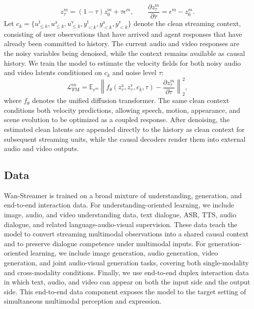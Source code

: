\documentclass{llmxive}
\begin{document}
\begin{equation}
\label{eq:flow-path}
    z_\tau^m=(1-\tau)z_0^m+\tau\epsilon^m, \qquad 
    \frac{\partial z_\tau^m}{\partial\tau} = \epsilon^m-z_0^m.
\end{equation}
Let $c_k=\{u_{\le k}^{\mathrm{t}},u_{\le k}^{\mathrm{a}},u_{\le k}^{\mathrm{v}},y_{<k}^{\mathrm{t}},y_{<k}^{\mathrm{a}},y_{<k}^{\mathrm{v}}\}$ denote the clean streaming context, consisting of user observations that have arrived and agent responses that have already been committed to history. The current audio and video responses are the noisy variables being denoised, while the context remains available as causal history. We train the model to estimate the velocity fields for both noisy audio and video latents conditioned on $c_k$ and noise level $\tau$:
\begin{equation}
\label{eq:joint-flow-matching}
    \mathcal L_{\mathrm{FM}}^m =  \mathbb{E}_{\epsilon^m} \left\| f_\theta \!\left(z_\tau^{\mathrm{a}},z_\tau^{\mathrm{v}},c_k,\tau\right) - \frac{\partial z_\tau^m}{\partial\tau} \right\|_2^2 ,
\end{equation}
where $f_\theta$ denotes the unified diffusion transformer. The same clean context conditions both velocity predictions, allowing speech, motion, appearance, and scene evolution to be optimized as a coupled response. After denoising, the estimated clean latents are appended directly to the history as clean context for subsequent streaming units, while the causal decoders render them into external audio and video outputs.



\subsection{Data}
Wan-Streamer is trained on a broad mixture of understanding, generation, and end-to-end interaction data. For understanding-oriented learning, we include image, audio, and video understanding data, text dialogue, ASR, TTS, audio dialogue, and related language-audio-visual supervision. These data teach the model to convert streaming multimodal observations into a shared causal context and to preserve dialogue competence under multimodal inputs. For generation-oriented learning, we include image generation, audio generation, video generation, and joint audio-visual generation tasks, covering both single-modality and cross-modality conditions. Finally, we use end-to-end duplex interaction data in which text, audio, and video can appear on both the input side and the output side. This end-to-end data component exposes the model to the target setting of simultaneous multimodal perception and expression.
\end{document}
